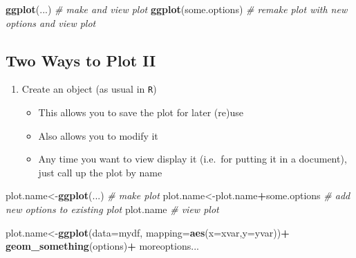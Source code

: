 \documentclass[]{book}
\newenvironment{Shaded}{\begin{snugshade}}{\end{snugshade}}
\newcommand{\KeywordTok}[1]{\textcolor[rgb]{0.13,0.29,0.53}{\textbf{#1}}}
\newcommand{\DataTypeTok}[1]{\textcolor[rgb]{0.13,0.29,0.53}{#1}}
\newcommand{\StringTok}[1]{\textcolor[rgb]{0.31,0.60,0.02}{#1}}
\newcommand{\CommentTok}[1]{\textcolor[rgb]{0.56,0.35,0.01}{\textit{#1}}}
\newcommand{\OperatorTok}[1]{\textcolor[rgb]{0.81,0.36,0.00}{\textbf{#1}}}
\newcommand{\NormalTok}[1]{#1}
\providecommand{\tightlist}{%
  \setlength{\itemsep}{0pt}\setlength{\parskip}{0pt}}
\theoremstyle{definition}
\theoremstyle{definition}
\theoremstyle{definition}
\theoremstyle{remark}
\begin{document}
\begin{Shaded}
\begin{Highlighting}[]
\KeywordTok{ggplot}\NormalTok{(...) }\CommentTok{# make and view plot}
\KeywordTok{ggplot}\NormalTok{(some.options) }\CommentTok{# remake plot with new options and view plot}
\end{Highlighting}
\end{Shaded}

\subsection{Two Ways to Plot II}\label{two-ways-to-plot-ii}

\begin{enumerate}
\def\labelenumi{\arabic{enumi}.}
\setcounter{enumi}{1}
\tightlist
\item
  Create an object (as usual in \texttt{R})

  \begin{itemize}
  \tightlist
  \item
    This allows you to save the plot for later (re)use
  \item
    Also allows you to modify it
  \item
    Any time you want to view display it (i.e.~for putting it in a
    document), just call up the plot by name
  \end{itemize}
\end{enumerate}

\begin{Shaded}
\begin{Highlighting}[]
\NormalTok{plot.name<-}\KeywordTok{ggplot}\NormalTok{(...) }\CommentTok{# make plot}
\NormalTok{plot.name<-plot.name}\OperatorTok{+}\NormalTok{some.options }\CommentTok{# add new options to existing plot}
\NormalTok{plot.name }\CommentTok{# view plot }
\end{Highlighting}
\end{Shaded}

\begin{Shaded}
\begin{Highlighting}[]
\NormalTok{plot.name<-}\KeywordTok{ggplot}\NormalTok{(}\DataTypeTok{data=}\NormalTok{mydf, }\DataTypeTok{mapping=}\KeywordTok{aes}\NormalTok{(}\DataTypeTok{x=}\NormalTok{xvar,}\DataTypeTok{y=}\NormalTok{yvar))}\OperatorTok{+}
\StringTok{  }\KeywordTok{geom_something}\NormalTok{(options)}\OperatorTok{+}
\StringTok{  }\NormalTok{moreoptions...}
\end{Highlighting}
\end{Shaded}
\end{document}
